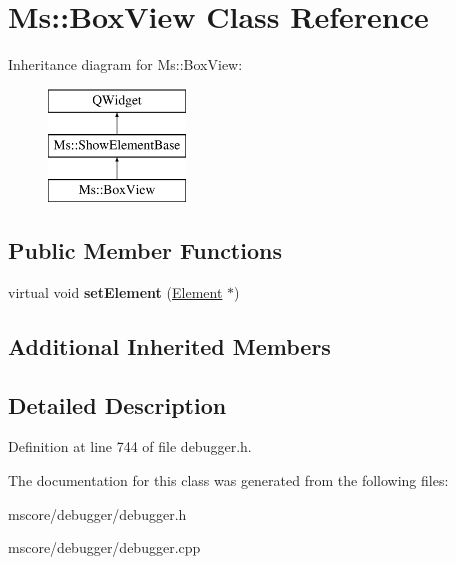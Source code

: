 \hypertarget{class_ms_1_1_box_view}{}\section{Ms\+:\+:Box\+View Class Reference}
\label{class_ms_1_1_box_view}
Inheritance diagram for Ms\+:\+:Box\+View\+:\begin{figure}[H]
\begin{center}
\leavevmode
\includegraphics[height=3.000000cm]{class_ms_1_1_box_view}
\end{center}
\end{figure}
\subsection*{Public Member Functions}
\begin{DoxyCompactItemize}
\item 
\mbox{\label{class_ms_1_1_box_view_af2b0dff64afea99a57e217700592f3da}} 
virtual void {\bfseries set\+Element} (\hyperlink{class_ms_1_1_element}{Element} $\ast$)
\end{DoxyCompactItemize}
\subsection*{Additional Inherited Members}


\subsection{Detailed Description}


Definition at line 744 of file debugger.\+h.



The documentation for this class was generated from the following files\+:\begin{DoxyCompactItemize}
\item 
mscore/debugger/debugger.\+h\item 
mscore/debugger/debugger.\+cpp\end{DoxyCompactItemize}
